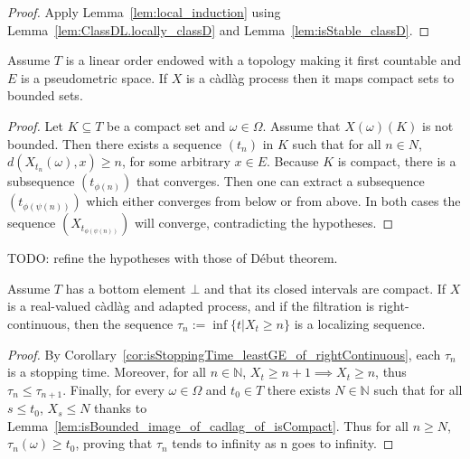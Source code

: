 \begin{proof}
Apply Lemma~\ref{lem:local_induction} using Lemma~\ref{lem:ClassDL.locally_classD} and Lemma~\ref{lem:isStable_classD}.
\end{proof}


\begin{lemma}\label{lem:isBounded_image_of_isCadlag_of_isCompact}
  \leanok
Assume $T$ is a linear order endowed with a topology making it first countable and $E$ is a pseudometric space. If $X$ is a càdlàg process then it maps compact sets to bounded sets.
\end{lemma}

\begin{proof}
Let $K \subseteq T$ be a compact set and $\omega \in \Omega$. Assume that $X(\omega)(K)$ is not bounded. Then there exists a sequence $(t_n)$ in $K$ such that for all $n \in N$, $d(X_{t_n}(\omega), x) \ge n$, for some arbitrary $x \in E$. Because $K$ is compact, there is a subsequence $(t_{\phi(n)})$ that converges. Then one can extract a subsequence $(t_{\phi(\psi(n))})$ which either converges from below or from above. In both cases the sequence $(X_{t_{\phi(\psi(n))}})$ will converge, contradicting the hypotheses.
\end{proof}

TODO: refine the hypotheses with those of Début theorem.
\begin{lemma}\label{lem:isLocalizingSequence_hittingAfter_Ici}
  \leanok
Assume $T$ has a bottom element $\bot$ and that its closed intervals are compact. If $X$ is a real-valued càdlàg and adapted process, and if the filtration is right-continuous, then the sequence $\tau_n := \inf \{t | X_t \ge n\}$ is a localizing sequence.
\end{lemma}

\begin{proof}
By Corollary~\ref{cor:isStoppingTime_leastGE_of_rightContinuous}, each $\tau_n$ is a stopping time. Moreover, for all $n \in \mathbb{N}$, $X_t \ge n+1 \implies X_t \ge n$, thus $\tau_n \le \tau_{n+1}$. Finally, for every $\omega \in \Omega$ and $t_0 \in T$ there exists $N \in \mathbb{N}$ such that for all $s \le t_0$, $X_s \le N$ thanks to Lemma~\ref{lem:isBounded_image_of_cadlag_of_isCompact}. Thus for all $n \ge N$, $\tau_n(\omega) \ge t_0$, proving that $\tau_n$ tends to infinity as n goes to infinity.
\end{proof}


